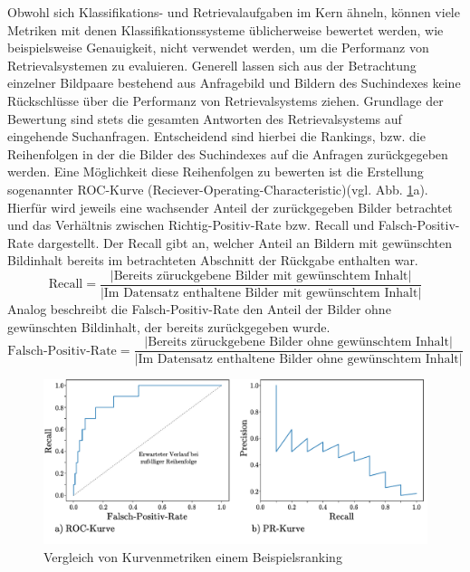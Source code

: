 Obwohl sich Klassifikations- und Retrievalaufgaben im Kern ähneln, können viele Metriken mit denen Klassifikationssysteme üblicherweise bewertet werden, wie beispielsweise Genauigkeit, nicht verwendet werden, um die Performanz von Retrievalsystemen zu evaluieren. Generell lassen sich aus der Betrachtung einzelner Bildpaare bestehend aus Anfragebild und Bildern des Suchindexes keine Rückschlüsse über die Performanz von Retrievalsystems ziehen.  Grundlage der Bewertung sind stets die gesamten Antworten des Retrievalsystems auf eingehende Suchanfragen. Entscheidend sind hierbei die Rankings, bzw. die Reihenfolgen in der die Bilder des Suchindexes auf die Anfragen zurückgegeben werden. Eine Möglichkeit diese Reihenfolgen zu bewerten ist die Erstellung sogenannter ROC-Kurve (Reciever-Operating-Characteristic)(vgl. Abb. \ref{metric_curve}a). Hierfür wird jeweils eine wachsender Anteil der zurückgegeben Bilder betrachtet und das Verhältnis zwischen Richtig-Positiv-Rate bzw. Recall und Falsch-Positiv-Rate dargestellt. Der Recall gibt an, welcher Anteil an Bildern mit gewünschten Bildinhalt bereits im betrachteten Abschnitt der Rückgabe enthalten war.
\begin{equation}
\text{Recall} = \frac{|\text{Bereits züruckgebene Bilder mit gewünschtem Inhalt}|}{|\text{Im Datensatz enthaltene Bilder mit gewünschtem Inhalt}|}
\end{equation}
Analog beschreibt die Falsch-Positiv-Rate den Anteil der Bilder ohne gewünschten Bildinhalt, der bereits zurückgegeben wurde.
\begin{equation}
\text{Falsch-Positiv-Rate} = \frac{|\text{Bereits züruckgebene Bilder ohne gewünschtem Inhalt}|}{|\text{Im Datensatz enthaltene Bilder ohne gewünschtem Inhalt}|}
\end{equation}
\begin{figure}[h]
\includegraphics[scale=0.76]{metric_curves.pdf}
\caption{Vergleich von Kurvenmetriken einem Beispielsranking}
\label{metric_curve}
\end{figure}
